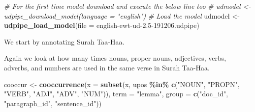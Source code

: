 \documentclass[
]{article}
\newenvironment{Shaded}{\begin{snugshade}}{\end{snugshade}}
\newcommand{\AttributeTok}[1]{\textcolor[rgb]{0.13,0.29,0.53}{#1}}
\newcommand{\CommentTok}[1]{\textcolor[rgb]{0.56,0.35,0.01}{\textit{#1}}}
\newcommand{\DecValTok}[1]{\textcolor[rgb]{0.00,0.00,0.81}{#1}}
\newcommand{\FunctionTok}[1]{\textcolor[rgb]{0.13,0.29,0.53}{\textbf{#1}}}
\newcommand{\NormalTok}[1]{#1}
\newcommand{\OtherTok}[1]{\textcolor[rgb]{0.56,0.35,0.01}{#1}}
\newcommand{\SpecialCharTok}[1]{\textcolor[rgb]{0.81,0.36,0.00}{\textbf{#1}}}
\newcommand{\StringTok}[1]{\textcolor[rgb]{0.31,0.60,0.02}{#1}}
\begin{document}
\footnotesize

\begin{Shaded}
\begin{Highlighting}[]
\CommentTok{\# For the first time model download and execute the below line too}
\CommentTok{\# udmodel \textless{}{-} udpipe\_download\_model(language = "english")}
\CommentTok{\# Load the model}
\NormalTok{udmodel }\OtherTok{\textless{}{-}} \FunctionTok{udpipe\_load\_model}\NormalTok{(}\AttributeTok{file =} \StringTok{\textquotesingle{}english{-}ewt{-}ud{-}2.5{-}191206.udpipe\textquotesingle{}}\NormalTok{)}
\end{Highlighting}
\end{Shaded}

\normalsize

We start by annotating Surah Taa-Haa.

\footnotesize

\begin{Shaded}
\end{Shaded}

\normalsize

Again we look at how many times nouns, proper nouns, adjectives, verbs, adverbs, and numbers are used in the same verse in Surah Taa-Haa.

\footnotesize

\begin{Shaded}
\begin{Highlighting}[]
\NormalTok{cooccur }\OtherTok{\textless{}{-}} \FunctionTok{cooccurrence}\NormalTok{(}\AttributeTok{x =} \FunctionTok{subset}\NormalTok{(x, upos }\SpecialCharTok{\%in\%} \FunctionTok{c}\NormalTok{(}\StringTok{"NOUN"}\NormalTok{, }\StringTok{"PROPN"}\NormalTok{, }\StringTok{"VERB"}\NormalTok{,}
                                                  \StringTok{"ADJ"}\NormalTok{, }\StringTok{"ADV"}\NormalTok{, }\StringTok{"NUM"}\NormalTok{)), }
                     \AttributeTok{term =} \StringTok{"lemma"}\NormalTok{, }
                     \AttributeTok{group =} \FunctionTok{c}\NormalTok{(}\StringTok{"doc\_id"}\NormalTok{, }\StringTok{"paragraph\_id"}\NormalTok{, }\StringTok{"sentence\_id"}\NormalTok{))}
\end{Highlighting}
\end{Shaded}
\end{document}
